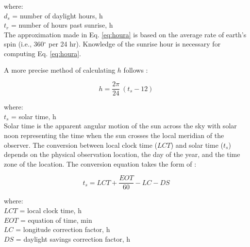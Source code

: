 \noindent where: \\
\indent $d_s$ = number of daylight hours, h \\
\indent $t_r$ = number of hours past sunrise, h\\

The approximation made in Eq. \ref{eq:houra} is based on the average rate of earth's spin (i.e., 360$^{\circ}$ per 24 hr). 
Knowledge of the sunrise hour is necessary for computing Eq. \ref{eq:houra}.

A more precise method of calculating $h$ follows \parencite[Eq. 3.1]{stine01}:

\begin{equation}
\label{eq:hour}
    h = \frac{2\pi}{24} \: (t_{s} - 12)
\end{equation}

\noindent where: \\
\indent $t_{s}$ = solar time, h \\

\noindent Solar time is the apparent angular motion of the sun across the sky with solar noon representing the time when the sun crosses the local meridian of the observer. 
The conversion between local clock time ($LCT$) and solar time ($t_{s}$) depends on the physical observation location, the day of the year, and the time zone of the location.  
The conversion equation takes the form of \parencite[Eq. 3.5]{stine01}:

%
\begin{equation}
\label{eq:soltime}
    t_{s} = LCT + \frac{EOT}{60} - LC - DS
\end{equation}

\noindent where: \\
\indent $LCT$ = local clock time, h \\
\indent $EOT$ = equation of time, min \\
\indent $LC$ = longitude correction factor, h \\
\indent $DS$  = daylight savings correction factor, h \\

